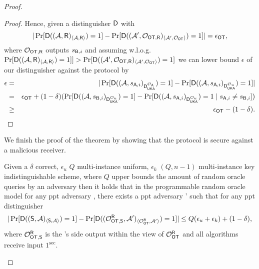 \begin{proof}
\begin{proof}
Hence, given a distinguisher $\mathsf D$ with
$$
|\Pr[\mathsf D((\mathcal{A},\mathsf{R})_{\langle \mathcal{A}, \mathsf{R}\rangle})=1] -\Pr[ \mathsf D((\mathcal{A}',\mathcal{O}_{\mathsf{OT}, \mathsf{R}})_{\langle \mathcal{A}', \mathcal{O}_{\mathsf{OT}}\rangle})=1]|=\epsilon_{\mathsf{OT}},
$$
where $\mathcal{O}_{\mathsf{OT}, \mathsf{R}}$ outputs $s_{\mathsf{B},i}$
and assuming w.l.o.g. 
$
\Pr[\mathsf D((\mathcal{A},\mathsf{R})_{\langle \mathcal{A}, \mathsf{R}\rangle})=1]]>\Pr[  \mathsf D((\mathcal{A}',\mathcal{O}_{\mathsf{OT}, \mathsf{R}})_{\langle \mathcal{A}', \mathcal{O}_{\mathsf{OT}}\rangle})=1]
$
 we can lower bound $\epsilon$ of our distinguisher against the \UKA protocol by
\begin{eqnarray*}
\epsilon &=&|\Pr[\mathsf D((\mathcal{A},s_{\mathsf{A},i})_{\mathsf D_{\mathsf{UKA}}^{\mathcal{O}_{\mathsf{A}}}})=1] -\Pr[ \mathsf D((\mathcal{A},s_{\mathsf{A},i})_{\mathsf D_{\mathsf{UKA}}^{\mathcal{O}_{u}}})=1]|\\
&=& \epsilon_{\mathsf{OT}} +(1-\delta)(\Pr[ \mathsf D((\mathcal{A},s_{\mathsf{B},i})_{\mathsf D_{\mathsf{UKA}}^{\mathcal{O}_{u}}})=1]-\Pr[ \mathsf D((\mathcal{A},s_{\mathsf{A},i})_{\mathsf D_{\mathsf{UKA}}^{\mathcal{O}_{u}}})=1\mid s_{\mathsf{A},i}\neq s_{\mathsf{B},i}])\\
&\geq &\epsilon_{\mathsf{OT}}-(1-\delta).
\end{eqnarray*}
\end{proof}

We finish the proof of the theorem by showing that the \OT protocol is secure against a malicious receiver.
\begin{claim}\label{claim:malreceiver}
Given a $\delta$ correct, $\epsilon_u$ $Q$ multi-instance uniform, $\epsilon_k$ $(Q,n-1)$ multi-instance key indistinguishable  \UKA scheme, where $Q$ upper bounds the amount of random oracle queries by an adversary then it holds that in the programmable random oracle model for any ppt adversary \Adv, there exists a ppt adversary \Adv' such that for any ppt distinguisher \D
$$
|\Pr[\mathsf D((\mathsf{S}, \mathcal{A})_{\langle \mathsf{S}, \mathcal{A}\rangle})=1] -\Pr[\mathsf D((\mathcal{O}_{\mathsf{OT},\mathsf{S}}^\mathsf{R},\mathcal{A}')_{\langle \mathcal{O}_{\mathsf{OT}}^\mathsf{R} , \mathcal{A}' \rangle})=1]|\leq Q(\epsilon_{u}+\epsilon_{k})+(1-\delta),
$$
where $\mathcal{O}_{\mathsf{OT},\mathsf{S}}^\mathsf{R}$ is  the \send's side output within the view of $\mathcal{O}_{\mathsf{OT}}^\mathsf{R}$ and all algorithms receive input $1^\sec$.
\end{claim}



\end{proof}
